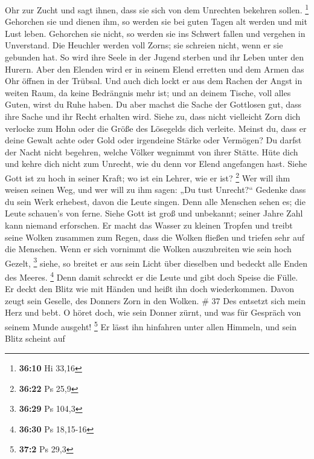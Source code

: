 Ohr zur Zucht und sagt ihnen, dass sie sich von dem Unrechten bekehren
sollen. \footnote{\textbf{36:10} Hi 33,16}  Gehorchen sie
und dienen ihm, so werden sie bei guten Tagen alt werden und mit Lust
leben.  Gehorchen sie nicht, so werden sie ins Schwert
fallen und vergehen in Unverstand.  Die Heuchler werden
voll Zorns; sie schreien nicht, wenn er sie gebunden hat. 
So wird ihre Seele in der Jugend sterben und ihr Leben unter den Hurern.
 Aber den Elenden wird er in seinem Elend erretten und dem
Armen das Ohr öffnen in der Trübsal.  Und auch dich lockt
er aus dem Rachen der Angst in weiten Raum, da keine Bedrängnis mehr
ist; und an deinem Tische, voll alles Guten, wirst du Ruhe haben.
 Du aber machst die Sache der Gottlosen gut, dass ihre
Sache und ihr Recht erhalten wird.  Siehe zu, dass nicht
vielleicht Zorn dich verlocke zum Hohn oder die Größe des Lösegelds dich
verleite.  Meinst du, dass er deine Gewalt achte oder Gold
oder irgendeine Stärke oder Vermögen?  Du darfst der Nacht
nicht begehren, welche Völker wegnimmt von ihrer Stätte. 
Hüte dich und kehre dich nicht zum Unrecht, wie du denn vor Elend
angefangen hast.  Siehe Gott ist zu hoch in seiner Kraft;
wo ist ein Lehrer, wie er ist? \footnote{\textbf{36:22} Ps 25,9}
 Wer will ihm weisen seinen Weg, und wer will zu ihm sagen:
„Du tust Unrecht?{}``  Gedenke dass du sein Werk erhebest,
davon die Leute singen.  Denn alle Menschen sehen es; die
Leute schauen's von ferne.  Siehe Gott ist groß und
unbekannt; seiner Jahre Zahl kann niemand erforschen.  Er
macht das Wasser zu kleinen Tropfen und treibt seine Wolken zusammen zum
Regen,  dass die Wolken fließen und triefen sehr auf die
Menschen.  Wenn er sich vornimmt die Wolken auszubreiten
wie sein hoch Gezelt, \footnote{\textbf{36:29} Ps 104,3} 
siehe, so breitet er aus sein Licht über dieselben und bedeckt alle
Enden des Meeres. \footnote{\textbf{36:30} Ps 18,15-16} 
Denn damit schreckt er die Leute und gibt doch Speise die Fülle.
 Er deckt den Blitz wie mit Händen und heißt ihn doch
wiederkommen.  Davon zeugt sein Geselle, des Donners Zorn
in den Wolken. \# 37  Des entsetzt sich mein Herz und bebt.
 O höret doch, wie sein Donner zürnt, und was für Gespräch
von seinem Munde ausgeht! \footnote{\textbf{37:2} Ps 29,3} 
Er lässt ihn hinfahren unter allen Himmeln, und sein Blitz scheint auf

